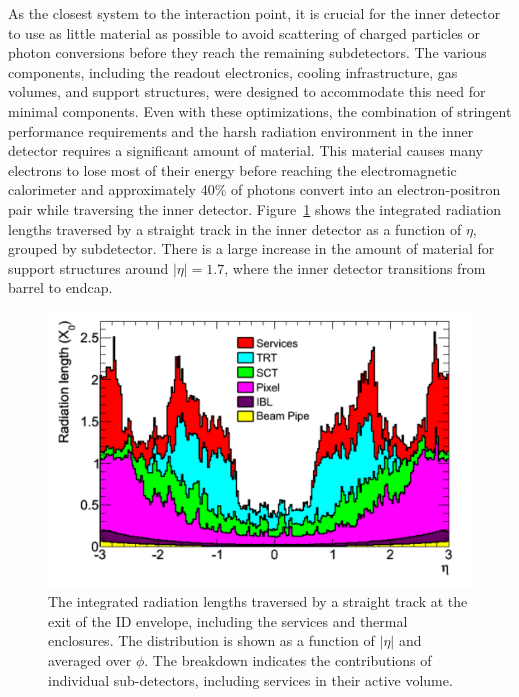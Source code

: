 As the closest system to the interaction point, it is crucial for the inner detector to use as little material as possible to avoid scattering of charged particles or photon conversions before they reach the remaining subdetectors.
The various components, including the readout electronics, cooling infrastructure, gas volumes, and support structures,  were designed to accommodate this need for minimal components.
Even with these optimizations, the combination of stringent performance requirements and the harsh radiation environment in the inner detector requires a significant amount of material.
This material causes many electrons to lose most of their energy before reaching the electromagnetic calorimeter and approximately 40\% of photons convert into an electron-positron pair while traversing the inner detector.
Figure~\ref{fig:id_material} shows the integrated radiation lengths traversed by a straight track in the inner detector as a function of $\eta$, grouped by subdetector.
There is a large increase in the amount of material for support structures around $|\eta| = 1.7$, where the inner detector transitions from barrel to endcap.


\begin{figure}
\centering
\includegraphics[width=\fullfig]{figures/id_material_subdetector.png}
\caption{The integrated radiation lengths traversed by a straight track at the exit of the ID envelope, including the services and thermal enclosures. The distribution is shown as a function of $|\eta|$ and averaged over $\phi$. The breakdown indicates the contributions of individual sub-detectors, including services in their active volume.}
\label{fig:id_material}
\end{figure}

